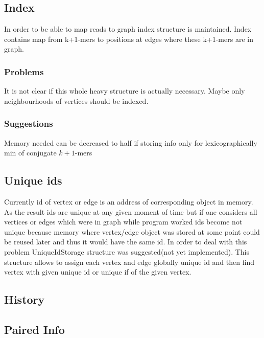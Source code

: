 \documentclass[12pt]{article}
\begin{document}

\subsection{Index}

In order to be able to map reads to graph index structure is maintained. Index contains map from k+1-mers to positions at edges where these k+1-mers are in graph.

\subsubsection{Problems}

It is not clear if this whole heavy structure is actually necessary. Maybe only neighbourhoods of vertices should be indexed.


\subsubsection{Suggestions}
Memory needed can be decreased to half if storing info only for lexicographically min of conjugate $k+1$-mers

\subsection{Unique ids}

Currently id of vertex or edge is an address of corresponding object in memory. As the result ids are unique at any given moment of time but if one considers all vertices or edges which were in graph while program worked ids become not unique because memory where vertex/edge object was stored at some point could be reused later and thus it would have the same id. In order to deal with this problem UniqueIdStorage structure was suggested(not yet implemented). This structure allows to assign each vertex and edge globally unique id and then find vertex with given unique id or unique if of the given vertex.

\subsection{History}

\subsection{Paired Info}
\end{document}
